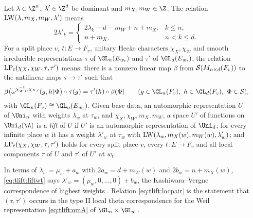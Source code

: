 \begin{definition}[Lifts]\label{pf:tlift:islift}
Let $\lambda\in\Z^n$, $\lambda'\in\Z^d$ be dominant and $m_X,m_W\in\Z$. The relation
$\mathrm{LW}(\lambda,m_X,m_W,\lambda')$ means
\begin{equation}\label{eq:tlift:liftwt}
  2\lambda'_k=\begin{cases}2\lambda_k-d-m_W+n+m_X,&k\le n,\\ n+m_X,&n<k\le d.\end{cases}
\end{equation}
For a split place $v$, $t\colon E\to F_v$, unitary Hecke characters $\chi_X,\chi_W$ and smooth irreducible
representations $\tau$ of $\GL_n(E_{w_t})$ and $\tau'$ of $\GL_d(E_{w_t})$, the relation
$\mathrm{LP}_t(\chi_X,\chi_W,\tau,\tau')$ means: there is a nonzero linear map $\beta$ from
$\mathcal{S}(M_{n\times d}(F_v))$ to the antilinear maps $\tau\to\tau'$ such that
\begin{equation}\label{eq:tlift:locpair}
  \beta\bigl(\omega^{\chi_{W,t}^{-1},\chi_{X,t}}(g,h)\Phi\bigr)\circ\tau(g)=\tau'(h)\circ\beta(\Phi)
  \qquad(g\in\GL_n(F_v),\ h\in\GL_d(F_v),\ \Phi\in\tliftS),
\end{equation}
with $\GL_n(F_v)\cong\GL_n(E_{w_t})$. Given base data, an automorphic representation $U$ of $\Uni_n$
with weights $\lambda_w$ at $\tau_w$, and $\chi_X,\chi_W,m_X,m_W$, a space $U'$ of functions on
$\Uni_d(\A)$ is a \emph{lift} of $U$ if $U'$ is an automorphic representation of $\Uni_d$; for every
infinite place $w$ it has a weight $\lambda'_w$ at $\tau_w$ with
$\mathrm{LW}(\lambda_w,m_X(w),m_W(w),\lambda'_w)$; and $\mathrm{LP}_t(\chi_X,\chi_W,\tau,\tau')$ holds for every
split place $v$, every $t\colon E\to F_v$ and all local components $\tau$ of $U$ and $\tau'$ of $U'$ at
$w_t$. 
\end{definition}

In terms of $\lambda_w=\mu_w+a_w$ with $2a_w=d+m_W(w)$ and $2b_w=n+m_X(w)$, \eqref{eq:tlift:liftwt}
says $\lambda'_w=(\mu_w,0,\dots,0)+b_w$, the Kashiwara--Vergne correspondence of highest weights
\cite{KashiwaraVergne1978}. Relation \eqref{eq:tlift:locpair} is the statement that $(\tau,\tau')$ occurs
in the type II local theta correspondence for the Weil representation \eqref{eq:tlift:omA} of
$\GL_n\times\GL_d$ \cite{Minguez2008}.

